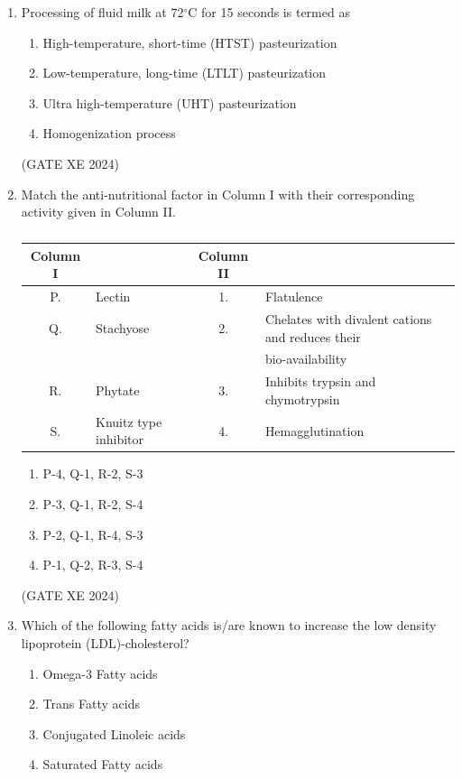\documentclass[12pt]{article}
\begin{document}
\begin{enumerate}
(GATE XE 2024)

\item Processing of fluid milk at 72$^{\circ}$C for 15 seconds is termed as

\begin{enumerate}
\item High-temperature, short-time (HTST) pasteurization
\item Low-temperature, long-time (LTLT) pasteurization
\item Ultra high-temperature (UHT) pasteurization
\item Homogenization process
\end{enumerate}

(GATE XE 2024)

\item Match the anti-nutritional factor in Column I with their corresponding activity given in Column II.  

\begin{table}[h!]
\centering \caption{} \label{}
\begin{tabular}{|c|l|c|l|}
\hline
\textbf{Column I} & & \textbf{Column II} & \\
\hline
P. & Lectin & 1. & Flatulence \\
Q. & Stachyose & 2. & Chelates with divalent cations and reduces their\\
&&&bio-availability \\
R. & Phytate & 3. & Inhibits trypsin and chymotrypsin \\
S. & Knuitz type inhibitor & 4. & Hemagglutination \\
\hline
\end{tabular}
\end{table}

\begin{enumerate}
\item P-4, Q-1, R-2, S-3  
\item P-3, Q-1, R-2, S-4  
\item P-2, Q-1, R-4, S-3  
\item P-1, Q-2, R-3, S-4  
\end{enumerate}

(GATE XE 2024)

\item Which of the following fatty acids is/are known to increase the low density lipoprotein (LDL)-cholesterol?  

\begin{enumerate}
\item Omega-3 Fatty acids  
\item Trans Fatty acids  
\item Conjugated Linoleic acids  
\item Saturated Fatty acids  
\end{enumerate}


\end{enumerate}
\end{document}
